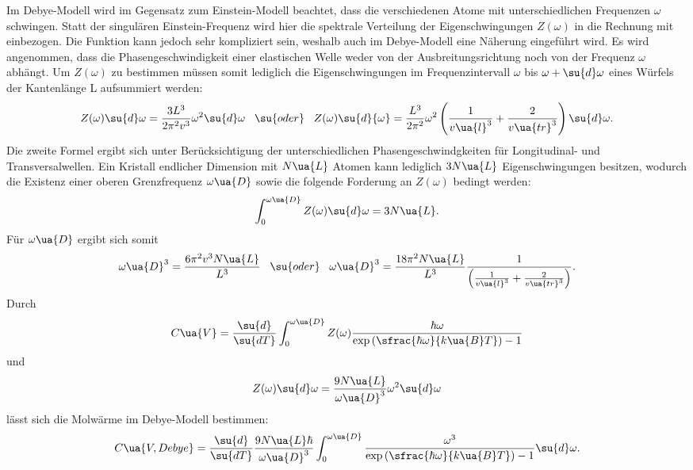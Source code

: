 Im Debye-Modell wird im Gegensatz zum Einstein-Modell beachtet, dass die verschiedenen
Atome mit unterschiedlichen Frequenzen $\omega$ schwingen. Statt der singulären
Einstein-Frequenz wird hier die spektrale Verteilung der Eigenschwingungen $Z(\omega)$
in die Rechnung mit einbezogen. Die Funktion kann jedoch sehr kompliziert sein,
weshalb auch im Debye-Modell eine Näherung eingeführt wird. Es wird angenommen,
dass die Phasengeschwindigkeit einer elastischen Welle weder von der Ausbreitungsrichtung
noch von der Frequenz $\omega$ abhängt. Um $Z(\omega)$ zu bestimmen müssen somit
lediglich die Eigenschwingungen im Frequenzintervall $\omega$ bis $\omega + \su{d}\omega$
eines Würfels der Kantenlänge L aufsummiert werden:
\begin{equation}
  \label{eqn:Z}
  Z(\omega)\su{d}\omega = \frac{3L^3}{2\pi^2v^3}\omega^2\su{d}\omega \,\,\,\,\, \su{oder} \,\,\,\,\,
  Z(\omega)\su{d}{\omega} = \frac{L^3}{2\pi^2}\omega^2\left( \frac{1}{v\ua{l}^3} + \frac{2}{v\ua{tr}^3}\right)\su{d}\omega.
\end{equation}
Die zweite Formel ergibt sich unter Berücksichtigung der unterschiedlichen Phasengeschwindgkeiten
für Longitudinal- und Transversalwellen.
Ein Kristall endlicher Dimension mit $N\ua{L}$ Atomen kann lediglich $3N\ua{L}$
Eigenschwingungen besitzen, wodurch die Existenz einer oberen Grenzfrequenz $\omega\ua{D}$
sowie die folgende Forderung an $Z(\omega)$ bedingt werden:
\begin{equation}
  \int_0^{\omega\ua{D}}Z(\omega)\su{d}\omega = 3N\ua{L}.
\end{equation}
Für $\omega\ua{D}$ ergibt sich somit
\begin{equation}
  \label{eqn:omega_D}
  \omega\ua{D}^3 = \frac{6\pi^2v^3N\ua{L}}{L^3} \,\,\,\,\, \su{oder} \,\,\,\,\,
  \omega\ua{D}^3 = \frac{18\pi^2N\ua{L}}{L^3} \frac{1}{\left(\frac{1}{v\ua{l}^3}+\frac{2}{v\ua{tr}^3}\right)}.
\end{equation}
Durch
\begin{equation}
  C\ua{V} = \frac{\su{d}}{\su{dT}} \int_0^{\omega\ua{D}} Z(\omega) \frac{\hbar\omega}{\exp{(\sfrac{\hbar\omega}{k\ua{B}T})}-1}
\end{equation}
und
\begin{equation}
  Z(\omega)\su{d}\omega = \frac{9N\ua{L}}{\omega\ua{D}^3}\omega^2 \su{d}\omega
\end{equation}
lässt sich die Molwärme im Debye-Modell bestimmen:
\begin{equation}
  C\ua{V, Debye} = \frac{\su{d}}{\su{dT}} \frac{9N\ua{L}\hbar}{\omega\ua{D}^3}\int_0^{\omega\ua{D}} \frac{\omega^3}{\exp{(\sfrac{\hbar\omega}{k\ua{B}T})}-1} \su{d}\omega.
\end{equation}
